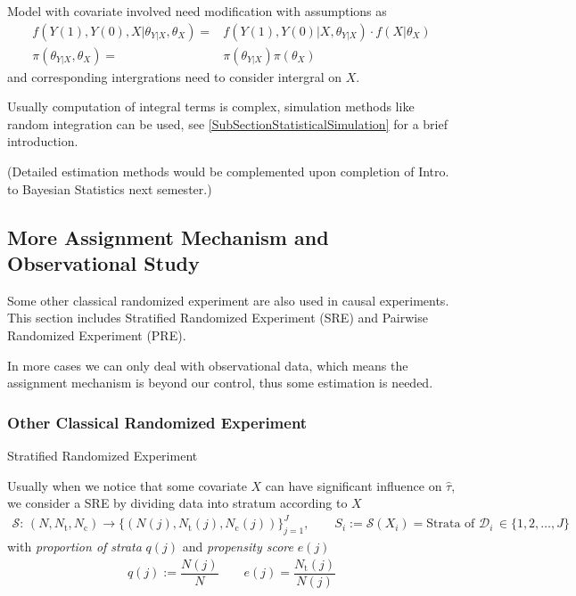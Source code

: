     Model with covariate involved need modification with assumptions as
    \begin{align}
        f\left(Y(1),Y(0),X|\theta _{Y|X},\theta _{X}\right) =& f\left(Y(1),Y(0)|X,\theta _{Y|X}\right) \cdot f\left(X|\theta _X\right)\\
        \pi(\theta _{Y|X},\theta _{X})=&\pi(\theta _{Y|X})\pi(\theta _X)
    \end{align}
    and corresponding intergrations need to consider intergral on $ X $.

    Usually computation of integral terms is complex, simulation methods like random integration can be used, see \autoref{SubSectionStatisticalSimulation} for a brief introduction.

    (Detailed estimation methods would be complemented upon completion of Intro. to Bayesian Statistics next semester.)
    


\subsection{More Assignment Mechanism and Observational Study}
Some other classical randomized experiment are also used in causal experiments. This section includes Stratified Randomized Experiment (SRE) and Pairwise Randomized Experiment (PRE).

In more cases we can only deal with observational data, which means the assignment mechanism is beyond our control, thus some estimation is needed.

\subsubsection{Other Classical Randomized Experiment}
\begin{point}
    Stratified Randomized Experiment
\end{point}

Usually when we notice that some covariate $ X $ can have significant influence on $ \hat{\tau} $, we consider a SRE by dividing data into stratum according to $ X $
\begin{align}
    \mathcal{S}:\,(N,N_\mathrm{t},N_\mathrm{c})\to \{\left(N(j),N_\mathrm{t}(j),N_\mathrm{c}(j)  \right)\}_{j=1}^J,\qquad S_i:=\mathcal{S}(X_i)=\text{Strata of }\mathcal{D}_i\,\in\{1,2,\ldots,J\}
\end{align}
with \textit{proportion of strata} $ q(j) $ and \textit{propensity score} $ e(j) $
\begin{align}
    q(j):=\dfrac{N(j)}{N}\qquad e(j)=\dfrac{N_\mathrm{t}(j) }{N(j)}
\end{align}

